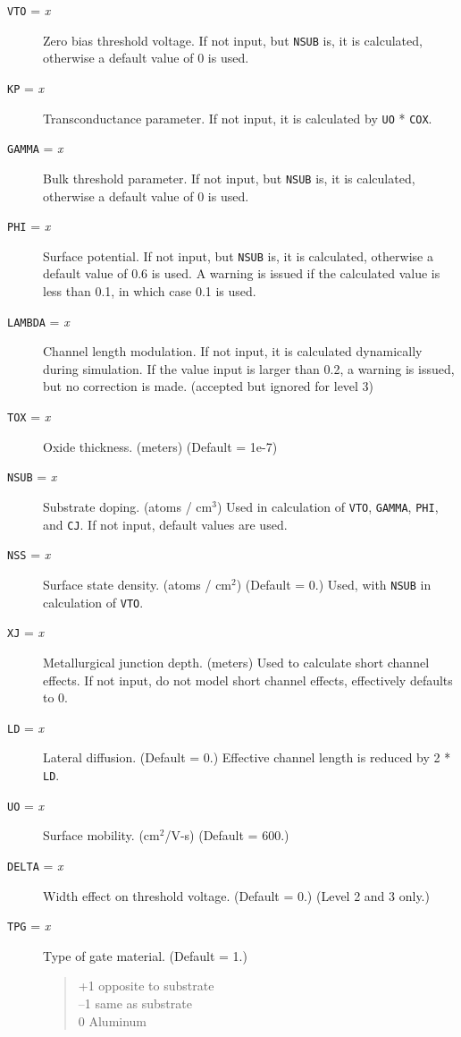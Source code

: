 \begin{description}

\item[{\tt VTO} = {\it x}] Zero bias threshold voltage.  If not input,
but {\tt NSUB} is, it is calculated, otherwise a default value of 0 is
used.

\item[{\tt KP} = {\it x}] Transconductance parameter.  If not input, it is
calculated by {\tt UO} * {\tt COX}.

\item[{\tt GAMMA} = {\it x}] Bulk threshold parameter.  If not input,
but {\tt NSUB} is, it is calculated, otherwise a default value of 0 is
used.

\item[{\tt PHI} = {\it x}] Surface potential.  If not input, but 
{\tt NSUB} is, it is calculated, otherwise a default value of 0.6 is
used.  A warning is issued if the calculated value is less than 0.1,
in which case 0.1 is used.

\item[{\tt LAMBDA} = {\it x}] Channel length modulation.  If not
input, it is calculated dynamically during simulation.  If the value
input is larger than 0.2, a warning is issued, but no correction is
made.  (accepted but ignored for level 3)

\item[{\tt TOX} = {\it x}] Oxide thickness. (meters) (Default = 1e-7)

\item[{\tt NSUB} = {\it x}] Substrate doping.  (atoms / cm$^3$) Used in
calculation of {\tt VTO}, {\tt GAMMA}, {\tt PHI}, and {\tt CJ}.  If
not input, default values are used.

\item[{\tt NSS} = {\it x}] Surface state density.  (atoms / cm$^2$) (Default
= 0.) Used, with {\tt NSUB} in calculation of {\tt VTO}.

\item[{\tt XJ} = {\it x}] Metallurgical junction depth. (meters) Used to
calculate short channel effects.  If not input, do not model short
channel effects, effectively defaults to 0.

\item[{\tt LD} = {\it x}] Lateral diffusion. (Default = 0.)  Effective
channel length is reduced by 2 * {\tt LD}.

\item[{\tt UO} = {\it x}] Surface mobility. (cm$^2$/V-s) (Default = 600.)

\item[{\tt DELTA} = {\it x}] Width effect on threshold voltage.
(Default = 0.)  (Level 2 and 3 only.)

\item[{\tt TPG} = {\it x}] Type of gate material. (Default = 1.)
\begin{verse}
+1 opposite to substrate\\
--1 same as substrate\\
0 Aluminum
\end{verse}

\end{description}
